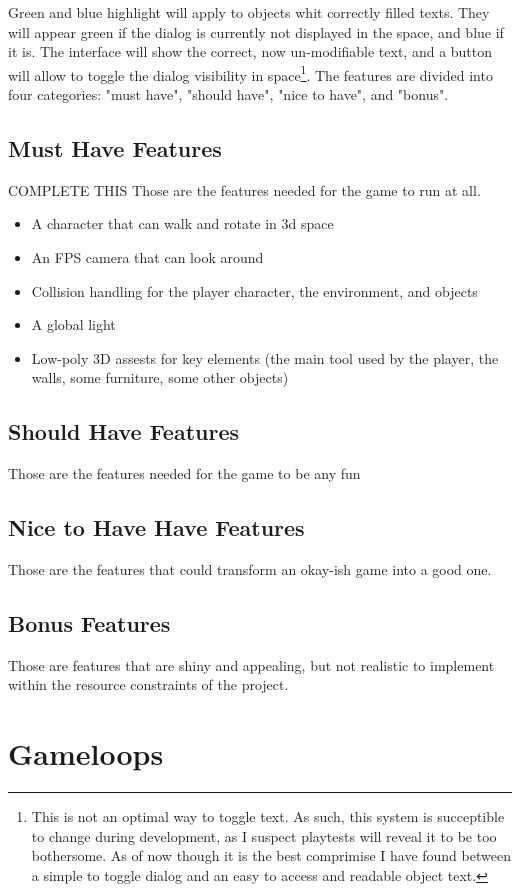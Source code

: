 \documentclass{scrartcl}
\begin{document}
			Green and blue highlight will apply to objects whit correctly filled texts. They will appear green if the dialog is currently not displayed in the space, and blue if it is. The interface will show the correct, now un-modifiable text, and a button will allow to toggle the dialog visibility in space\footnote{This is not an optimal way to toggle text. As such, this system is succeptible to change during development, as I suspect playtests will reveal it to be too bothersome. As of now though it is the best comprimise I have found between a simple to toggle dialog and an easy to access and readable object text.}.
			The features are divided into four categories: "must have", "should have", "nice to have", and "bonus".
		\subsection{Must Have Features}
		COMPLETE THIS
			Those are the features needed for the game to run at all.
			\begin{itemize}
				\item A character that can walk and rotate in 3d space
				\item An FPS camera that can look around
				\item Collision handling for the player character, the environment, and objects
				\item A global light
				\item Low-poly 3D assests for key elements (the main tool used by the player, the walls, some furniture, some other objects)
				
			\end{itemize}
		\subsection{Should Have Features}
			Those are the features needed for the game to be any fun
		\subsection{Nice to Have Have Features}
			Those are the features that could transform an okay-ish game into a good one.
		\subsection{Bonus Features}
			Those are features that are shiny and appealing, but not realistic to implement within the resource constraints of the project.
	\section{Gameloops}
\end{document}
